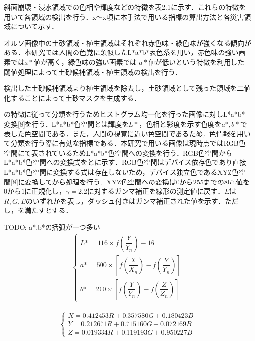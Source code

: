       斜面崩壊・浸水領域での色相や輝度などの特徴を表2.1に示す．これらの特徴を用いて各領域の検出を行う．x〜x項に本手法で用いる指標の算出方法と各災害領域について示す．

      オルソ画像中の土砂領域・植生領域はそれぞれ赤色味・緑色味が強くなる傾向がある．本研究では人間の色覚に類似したL*a*b*表色系を用い，赤色味の強い画素では$a*$値が高く，緑色味の強い画素では $a*$値が低いという特徴を利用した閾値処理によって土砂候補領域・植生領域の検出を行う．
      
      検出した土砂候補領域より植生領域を除去し，土砂領域として残った領域を二値化することによって土砂マスクを生成する．


      \tref{}の特徴に従って分類を行うためヒストグラム均一化を行った画像に対しL*a*b*変換[8]を行う．L*a*b*色空間とは輝度を$L*$，色相と彩度を示す色度を$a*,b*$で表した色空間である．また，人間の視覚に近い色空間であるため，色情報を用いて分類を行う際に有効な指標である．本研究で用いる画像は現時点ではRGB色空間にて表されているためL*a*b*色空間への変換を行う．RGB色空間からL*a*b*色空間への変換式をとに示す．RGB色空間はデバイス依存色であり直接L*a*b*色空間に変換する式は存在しないため，デバイス独立色であるXYZ色空間[8]に変換してから処理を行う．XYZ色空間への変換は$0$から$255$までの8bit値を$0$から$1$に正規化し，$γ=2.2$に対するガンマ補正を線形の測定値に戻す．$E$は$R,G,B$のいずれかを表し，ダッシュ付きはガンマ補正された値を示す．ただし，を満たすとする．

      TODO: a*,b*の括弧が一つ多い
      \begin{eqnarray}
      \label{Lab表色系1}
        \left\{
          \begin{array}{l}
            L* = 116 \times f(\dfrac{Y} {Y_{n}}) - 16 \\
            a* = 500 \times [f(\dfrac{X} {X_{n}}) - f(\dfrac{Y} {Y_{n}})] \\
            b* = 200 \times [f(\dfrac{Y} {Y_{n}}) - f(\dfrac{Z} {Z_{n}})]
          \end{array}
        \right.
      \end{eqnarray}

      \begin{eqnarray}
        \label{Lab表色系2}
        \left\{
          \begin{array}{l}
            X = 0.412453R + 0.357580G + 0.180423B \\
            Y = 0.212671R + 0.715160G + 0.072169B \\
            Z = 0.019334R + 0.119193G + 0.950227B
          \end{array}
        \right.
      \end{eqnarray}

